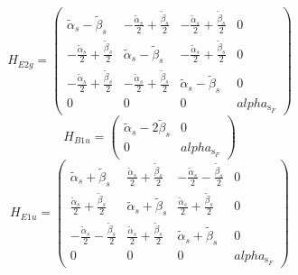 \documentclass[12pt,a4paper]{article}
\begin{document}
     $$ H_{E2g}= \begin{pmatrix}\tilde{\alpha}_{s} - \tilde{\beta}_{s} & - \frac{\tilde{\alpha}_{s}}{2} + \frac{\tilde{\beta}_{s}}{2} & - \frac{\tilde{\alpha}_{s}}{2} + \frac{\tilde{\beta}_{s}}{2} & 0\\- \frac{\tilde{\alpha}_{s}}{2} + \frac{\tilde{\beta}_{s}}{2} & \tilde{\alpha}_{s} - \tilde{\beta}_{s} & - \frac{\tilde{\alpha}_{s}}{2} + \frac{\tilde{\beta}_{s}}{2} & 0\\- \frac{\tilde{\alpha}_{s}}{2} + \frac{\tilde{\beta}_{s}}{2} & - \frac{\tilde{\alpha}_{s}}{2} + \frac{\tilde{\beta}_{s}}{2} & \tilde{\alpha}_{s} - \tilde{\beta}_{s} & 0\\0 & 0 & 0 & alpha_{\text{s}_F}\end{pmatrix}$$ 
     $$ H_{B1u}= \begin{pmatrix}\tilde{\alpha}_{s} - 2 \tilde{\beta}_{s} & 0\\0 & alpha_{\text{s}_F}\end{pmatrix}$$ 
     $$ H_{E1u}= \begin{pmatrix}\tilde{\alpha}_{s} + \tilde{\beta}_{s} & \frac{\tilde{\alpha}_{s}}{2} + \frac{\tilde{\beta}_{s}}{2} & - \frac{\tilde{\alpha}_{s}}{2} - \frac{\tilde{\beta}_{s}}{2} & 0\\\frac{\tilde{\alpha}_{s}}{2} + \frac{\tilde{\beta}_{s}}{2} & \tilde{\alpha}_{s} + \tilde{\beta}_{s} & \frac{\tilde{\alpha}_{s}}{2} + \frac{\tilde{\beta}_{s}}{2} & 0\\- \frac{\tilde{\alpha}_{s}}{2} - \frac{\tilde{\beta}_{s}}{2} & \frac{\tilde{\alpha}_{s}}{2} + \frac{\tilde{\beta}_{s}}{2} & \tilde{\alpha}_{s} + \tilde{\beta}_{s} & 0\\0 & 0 & 0 & alpha_{\text{s}_F}\end{pmatrix}$$ 
\end{document}
